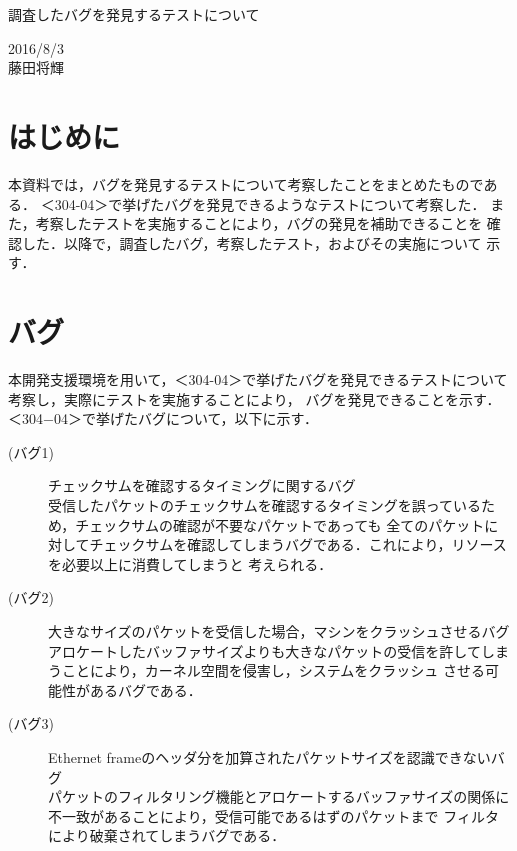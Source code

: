 \documentclass[12pt]{jsarticle}
\begin{document}

\begin{center}
    {\LARGE 調査したバグを発見するテストについて}
\end{center}

\begin{flushright}
    2016/8/3\\
    藤田将輝
\end{flushright}
\section{はじめに}
本資料では，バグを発見するテストについて考察したことをまとめたものである．
＜304-04＞で挙げたバグを発見できるようなテストについて考察した．
また，考察したテストを実施することにより，バグの発見を補助できることを
確認した．以降で，調査したバグ，考察したテスト，およびその実施について
示す．


\section{バグ}
本開発支援環境を用いて，＜304-04＞で挙げたバグを発見できるテストについて考察し，実際にテストを実施することにより，
バグを発見できることを示す．
＜304−04＞で挙げたバグについて，以下に示す．
\begin{description}
    \item[(バグ1)]チェックサムを確認するタイミングに関するバグ\\
        受信したパケットのチェックサムを確認するタイミングを誤っているため，チェックサムの確認が不要なパケットであっても
        全てのパケットに対してチェックサムを確認してしまうバグである．これにより，リソースを必要以上に消費してしまうと
        考えられる．
    \item[(バグ2)]大きなサイズのパケットを受信した場合，マシンをクラッシュさせるバグ\\
        アロケートしたバッファサイズよりも大きなパケットの受信を許してしまうことにより，カーネル空間を侵害し，システムをクラッシュ
        させる可能性があるバグである．
    \item[(バグ3)]Ethernet frameのヘッダ分を加算されたパケットサイズを認識できないバグ\\
        パケットのフィルタリング機能とアロケートするバッファサイズの関係に不一致があることにより，受信可能であるはずのパケットまで
        フィルタにより破棄されてしまうバグである．
\end{description}
\end{document}
